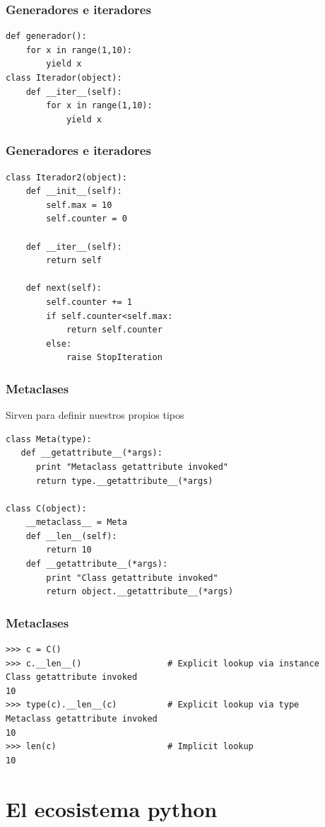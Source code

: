 \documentclass[10pt]{beamer}
\begin{document}
  \begin{frame}[containsverbatim]
    \frametitle{Generadores e iteradores}
    \begin{verbatim}
def generador():
    for x in range(1,10):
        yield x
class Iterador(object):
    def __iter__(self):
        for x in range(1,10):
            yield x
    \end{verbatim}
  \end{frame}

  \begin{frame}[containsverbatim]
    \frametitle{Generadores e iteradores}
    \begin{verbatim}
class Iterador2(object):
    def __init__(self):
        self.max = 10
        self.counter = 0

    def __iter__(self):
        return self

    def next(self):
        self.counter += 1
        if self.counter<self.max:
            return self.counter
        else:
            raise StopIteration
    \end{verbatim}
  \end{frame}

  \begin{frame}[containsverbatim]
    \frametitle{Metaclases}
    Sirven para definir nuestros propios tipos
    \begin{verbatim}
class Meta(type):
   def __getattribute__(*args):
      print "Metaclass getattribute invoked"
      return type.__getattribute__(*args)

class C(object):
    __metaclass__ = Meta
    def __len__(self):
        return 10
    def __getattribute__(*args):
        print "Class getattribute invoked"
        return object.__getattribute__(*args)
    \end{verbatim}
  \end{frame}

  \begin{frame}[containsverbatim]
    \frametitle{Metaclases}
    \begin{verbatim}
>>> c = C()
>>> c.__len__()                 # Explicit lookup via instance
Class getattribute invoked
10
>>> type(c).__len__(c)          # Explicit lookup via type
Metaclass getattribute invoked
10
>>> len(c)                      # Implicit lookup
10
    \end{verbatim}
  \end{frame}

  \section{El ecosistema python}
\end{document}
